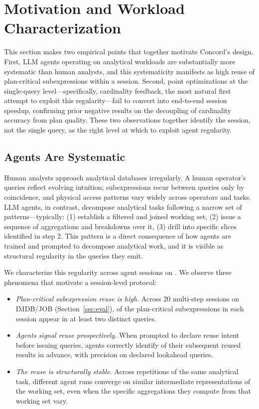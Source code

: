 \section{Motivation and Workload Characterization}
\label{sec:motivation}

This section makes two empirical points that together motivate Concord's design. First, LLM agents operating on analytical workloads are substantially more systematic than human analysts, and this systematicity manifests as high reuse of plan-critical subexpressions within a session. Second, point optimizations at the single-query level---specifically, cardinality feedback, the most natural first attempt to exploit this regularity---fail to convert into end-to-end session speedup, confirming prior negative results on the decoupling of cardinality accuracy from plan quality. These two observations together identify the session, not the single query, as the right level at which to exploit agent regularity.

\subsection{Agents Are Systematic}
\label{sec:motivation:systematic}

Human analysts approach analytical databases irregularly. A human operator's queries reflect evolving intuition; subexpressions recur between queries only by coincidence, and physical access patterns vary widely across operators and tasks. LLM agents, in contrast, decompose analytical tasks following a narrow set of patterns---typically: (1) establish a filtered and joined working set, (2) issue a sequence of aggregations and breakdowns over it, (3) drill into specific slices identified in step 2. This pattern is a direct consequence of how agents are trained and prompted to decompose analytical work, and it is visible as structural regularity in the queries they emit.

We characterize this regularity across  agent sessions on . We observe three phenomena that motivate a session-level protocol:

\begin{itemize}
\item \emph{Plan-critical subexpression reuse is high.} Across 20 multi-step sessions on IMDB/JOB (Section~\ref{sec:eval}),  of the plan-critical subexpressions in each session appear in at least two distinct queries.

\item \emph{Agents signal reuse prospectively.} When prompted to declare reuse intent before issuing queries, agents correctly identify \adoptionRate of their subsequent reused results in advance, with \mTwoPrecision precision on declared lookahead queries.

\item \emph{The reuse is structurally stable.} Across repetitions of the same analytical task, different agent runs converge on similar intermediate representations of the working set, even when the specific aggregations they compute from that working set vary.
\end{itemize}


